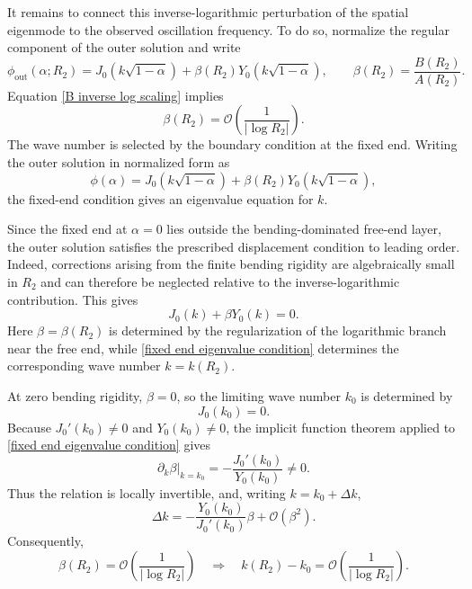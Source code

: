 \documentclass{article}[12pt]
\theoremstyle{Theorem}
\begin{document}
It remains to connect this inverse-logarithmic perturbation of the spatial eigenmode to the observed oscillation frequency. To do so, normalize the regular component of the outer solution and write
\begin{equation}
    \phi_{\mathrm{out}}(\alpha;R_2)
    =
    J_0(k\sqrt{1-\alpha})
    +
    \beta(R_2)
    Y_0(k\sqrt{1-\alpha}),
    \qquad
    \beta(R_2)=\frac{B(R_2)}{A(R_2)}.
\end{equation}
Equation \eqref{B inverse log scaling} implies
\begin{equation}
    \beta(R_2)
    =
    \mathcal{O}\left(\frac{1}{|\log R_2|}\right).
\end{equation}
The wave number is selected by the boundary condition at the fixed end.  Writing the outer solution in normalized form as
\begin{equation}
    \phi(\alpha)
    =
    J_0\!\left(k\sqrt{1-\alpha}\right)
    +
    \beta(R_2)
    Y_0\!\left(k\sqrt{1-\alpha}\right),
\end{equation}
the fixed-end condition gives an eigenvalue equation for $k$.
\newline

Since the fixed end at $\alpha=0$ lies outside the bending-dominated free-end layer, the outer solution satisfies the prescribed displacement condition to leading order. Indeed, corrections arising from the finite bending rigidity are algebraically small in $R_2$ \cite{manela2017hanging} and can therefore be neglected relative to the inverse-logarithmic contribution. This gives 
\begin{equation}
J_0(k)+\beta Y_0(k)=0.
\label{fixed end eigenvalue condition}
\end{equation}
Here $\beta=\beta(R_2)$ is determined by the regularization of the logarithmic branch near the free end, while \eqref{fixed end eigenvalue condition} determines the corresponding wave number $k=k(R_2)$. 

At zero bending rigidity, $\beta=0$, so the limiting wave number $k_0$ is determined by
\begin{equation}
J_0(k_0)=0.
\end{equation}
Because $J_0'(k_0)\neq0$ and $Y_0(k_0)\neq0$, the implicit function theorem applied to \eqref{fixed end eigenvalue condition} gives
\begin{equation}
\left.\partial_k\beta\right|_{k=k_0}
=
-\frac{J_0'(k_0)}{Y_0(k_0)}
\neq0.
\end{equation}
Thus the relation is locally invertible, and, writing $k=k_0+\Delta k$,
\begin{equation}
\Delta k
=
-\frac{Y_0(k_0)}{J_0'(k_0)}\beta
+
\mathcal{O}(\beta^2).
\end{equation}
Consequently,
\begin{equation}
\beta(R_2)
=
\mathcal{O}\left(\frac{1}{|\log R_2|}\right)
\quad\Longrightarrow\quad
k(R_2)-k_0
=
\mathcal{O}\left(\frac{1}{|\log R_2|}\right).
\label{k inverse log scaling}
\end{equation}
\end{document}
